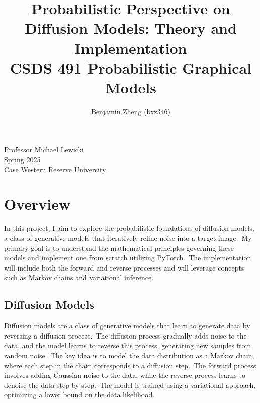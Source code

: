 \documentclass[12pt]{article}
\begin{document}
 
\title{Probabilistic Perspective on Diffusion Models: Theory and Implementation\\
\vspace{0.5cm}
\large CSDS 491 Probabilistic Graphical Models\\
\vspace{0.5cm}}
\author{Benjamin Zheng (bxz346)}
\date{}
\maketitle

\vspace{9cm}

\begin{centering}
\large
Professor Michael Lewicki\\
\vspace{0.25cm}
Spring 2025\\
\vspace{0.25cm}
Case Western Reserve University

\end{centering}
\pagebreak

\section{Overview}
In this project, I aim to explore the probabilistic foundations of diffusion models, a class of generative models that iteratively refine noise into a target image.\
My primary goal is to understand the mathematical principles governing these models and implement one from scratch utilizing PyTorch.\
The implementation will include both the forward and reverse processes and will leverage concepts such as Markov chains and variational inference.\

\subsection{Diffusion Models}
Diffusion models are a class of generative models that learn to generate data by reversing a diffusion process.\
The diffusion process gradually adds noise to the data, and the model learns to reverse this process, generating new samples from random noise.\
The key idea is to model the data distribution as a Markov chain, where each step in the chain corresponds to a diffusion step.\
The forward process involves adding Gaussian noise to the data, while the reverse process learns to denoise the data step by step.\
The model is trained using a variational approach, optimizing a lower bound on the data likelihood.\
\end{document}
